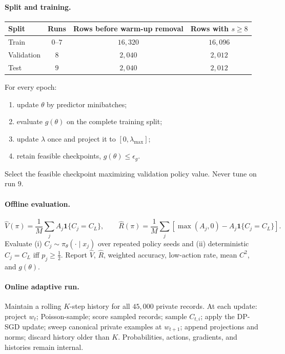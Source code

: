 \documentclass[10pt]{article}
\newcommand{\1}{\mathbf{1}}
\begin{document}
\paragraph{Split and training.}
\begin{center}
\begin{tabular}{lccc}
\toprule
Split & Runs & Rows before warm-up removal & Rows with $s\ge8$ \\
\midrule
Train & $0$--$7$ & $16{,}320$ & $16{,}096$ \\
Validation & $8$ & $2{,}040$ & $2{,}012$ \\
Test & $9$ & $2{,}040$ & $2{,}012$ \\
\bottomrule
\end{tabular}
\end{center}
For every epoch:
\begin{enumerate}
  \item update $\theta$ by predictor minibatches;
  \item evaluate $g(\theta)$ on the complete training split;
  \item update $\lambda$ once and project it to $[0,\lambda_{\max}]$;
  \item retain feasible checkpoints, $g(\theta)\le\epsilon_g$.
\end{enumerate}
Select the feasible checkpoint maximizing validation policy value. Never tune
on run $9$.

\paragraph{Offline evaluation.}
\[
\widehat V(\pi)=\frac1M\sum_jA_j\1\{C_j=C_L\},\qquad
\widehat R(\pi)=\frac1M\sum_j
\left[\max(A_j,0)-A_j\1\{C_j=C_L\}\right].
\]
Evaluate (i) $C_j\sim\pi_\theta(\cdot\mid x_j)$ over repeated policy seeds and
(ii) deterministic $C_j=C_L$ iff $p_j\ge\tfrac12$. Report $\widehat V$,
$\widehat R$, weighted accuracy, low-action rate, mean $C^2$, and $g(\theta)$.

\paragraph{Online adaptive run.}
Maintain a rolling $K$-step history for all $45{,}000$ private records. At
each update: project $w_t$; Poisson-sample; score sampled records; sample
$C_{t,i}$; apply the DP-SGD update; sweep canonical private examples at
$w_{t+1}$; append projections and norms; discard history older than $K$.
Probabilities, actions, gradients, and histories remain internal.
\end{document}
